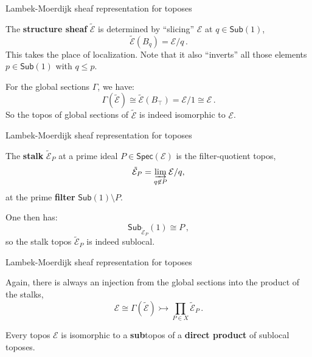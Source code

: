 \documentclass{beamer}
\newcommand{\E}{\ensuremath{\mathcal{E}}}
\newcommand{\myemph}[1]{\textbf{#1}}    %
\begin{document}
\begin{frame}{Lambek-Moerdijk sheaf representation for toposes}


The \myemph{structure sheaf} $\tilde{\E}$ is determined by ``slicing'' $\E$ at $q \in\mathsf{Sub}(1)$,
\[
\tilde{\E}(B_q) = \E/q\,.
\]
This takes the place of localization.  Note that it also ``inverts'' all those elements $p\in \mathsf{Sub}(1)$ with $q\leq p$. 
\bigskip

For the global sections $\Gamma$, we have:
$$\Gamma(\tilde{\E}) \cong \tilde{\E}(B_\top) = \E/1 \cong \E\,.$$
So the topos of global sections of $\tilde{\E}$ is indeed  isomorphic to $\E$.
\end{frame}
\begin{frame}{Lambek-Moerdijk sheaf representation for toposes}

The \myemph{stalk} $\tilde{\E}_P$ at a prime ideal $P\in \mathsf{Spec}(\E)$ is the filter-quotient topos,
\[
\tilde{\E}_P = \varinjlim_{q\not\in P} \E/q, 
\]
at the prime \myemph{filter} $\mathsf{Sub}(1)\!\setminus\! P$.  
\medskip

One then has:
\[
\mathsf{Sub}_{\tilde{\E}_P}(1)\cong P\,,
\]
so the stalk topos $\tilde{\E}_P$ is indeed sublocal.

\end{frame}
\begin{frame}{Lambek-Moerdijk sheaf representation for toposes}

Again, there is always an injection from the global sections into the product of the stalks,
\[
\E \cong \Gamma(\tilde{\E}) \rightarrowtail \prod_{P\in X}\tilde{\E}_P\,.
\]

\begin{corollary}
Every topos $\E$ is isomorphic to a \myemph{sub}topos of a \myemph{direct product} of sublocal toposes.
\end{corollary}


\end{frame}
\end{document}
